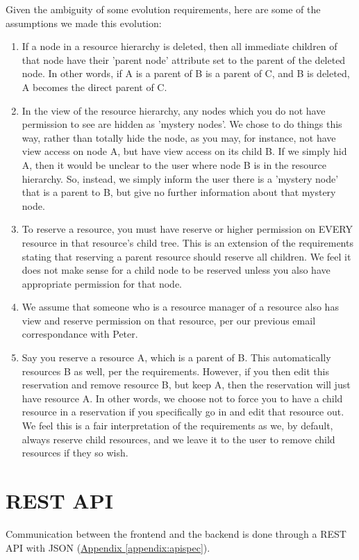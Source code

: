 \documentclass[12pt]{article}
\begin{document}
Given the ambiguity of some evolution requirements, here are some of the assumptions we made this evolution:
\begin{enumerate}
    \item If a node in a resource hierarchy is deleted, then all immediate children of that node have their 'parent node' attribute set to the parent of the deleted node. In other words, if A is a parent of B is a parent of C, and B is deleted, A becomes the direct parent of C. 
    \item In the view of the resource hierarchy, any nodes which you do not have permission to see are hidden as 'mystery nodes'. We chose to do things this way, rather than totally hide the node, as you may, for instance, not have view access on node A, but have view access on its child B. If we simply hid A, then it would be unclear to the user where node B is in the resource hierarchy. So, instead, we simply inform the user there is a 'mystery node' that is a parent to B, but give no further information about that mystery node. 
    \item To reserve a resource, you must have reserve or higher permission on EVERY resource in that resource's child tree. This is an extension of the requirements stating that reserving a parent resource should reserve all children. We feel it does not make sense for a child node to be reserved unless you also have appropriate permission for that node. 
    \item We assume that someone who is a resource manager of a resource also has view and reserve permission on that resource, per our previous email correspondance with Peter. 
    \item Say you reserve a resource A, which is a parent of B. This automatically resources B as well, per the requirements. However, if you then edit this reservation and remove resource B, but keep A, then the reservation will just have resource A. In other words, we choose not to force you to have a child resource in a reservation if you specifically go in and edit that resource out. We feel this is a fair interpretation of the requirements as we, by default, always reserve child resources, and we leave it to the user to remove child resources if they so wish. 
\end{enumerate}


\section{REST API}
\label{sec:REST}
Communication between the frontend and the backend is done through a REST API with JSON (\hyperref[appendix:apispec]{Appendix \ref{appendix:apispec}}).
\end{document}

